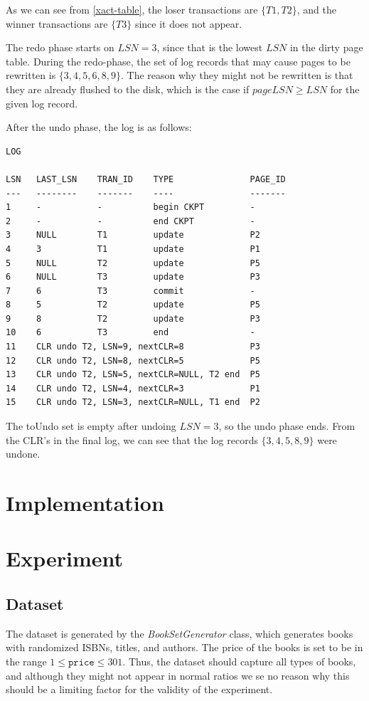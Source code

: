 \documentclass[11pt,a4paper]{article}
\begin{document}
As we can see from \autoref{xact-table}, the loser transactions are
$\{T1,T2\}$, and the winner transactions are $\{T3\}$ since it does not appear.

The redo phase starts on $LSN = 3$, since that is the lowest $LSN$ in the dirty
page table. During the redo-phase, the set of log records that may cause pages
to be rewritten is $\{3,4,5,6,8,9\}$. The reason why they might not be
rewritten is that they are already flushed to the disk, which is the case if
$pageLSN \geq LSN$ for the given log record.

After the undo phase, the log is as follows:

\begin{verbatim}
LOG

LSN   LAST_LSN    TRAN_ID    TYPE               PAGE_ID
---   --------    -------    ----               -------
1     -           -          begin CKPT         -
2     -           -          end CKPT           -
3     NULL        T1         update             P2
4     3           T1         update             P1
5     NULL        T2         update             P5
6     NULL        T3         update             P3
7     6           T3         commit             -
8     5           T2         update             P5
9     8           T2         update             P3
10    6           T3         end                -
11    CLR undo T2, LSN=9, nextCLR=8             P3
12    CLR undo T2, LSN=8, nextCLR=5             P5
13    CLR undo T2, LSN=5, nextCLR=NULL, T2 end  P5
14    CLR undo T2, LSN=4, nextCLR=3             P1
15    CLR undo T2, LSN=3, nextCLR=NULL, T1 end  P2
\end{verbatim}

The toUndo set is empty after undoing $LSN = 3$, so the undo phase ends. From
the CLR's in the final log, we can see that the log records $\{3,4,5,8,9\}$
were undone.

\section{Implementation}


\section*{Experiment}
\subsection*{Dataset}
The dataset is generated by the {\it BookSetGenerator} class, which generates
books with randomized ISBNs, titles, and authors. The price of the books is set
to be in the range $1 \leq \mathtt{price} \leq 301$. Thus, the dataset should
capture all types of books, and although they might not appear in normal ratios
we se no reason why this should be a limiting factor for the validity of the
experiment.
\end{document}
